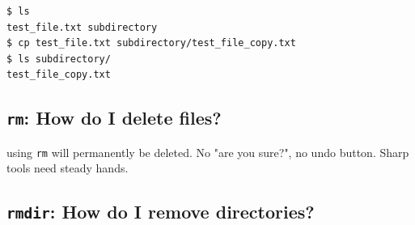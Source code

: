 \begin{lstlisting}
$ ls
test_file.txt subdirectory
$ cp test_file.txt subdirectory/test_file_copy.txt
$ ls subdirectory/
test_file_copy.txt
\end{lstlisting}


\subsection{\texttt{rm}: How do I delete files?}
\begin{tcolorbox}[colback=red!5!white, colframe=red!60!black,
                  title=\textbf{Notice}, fonttitle=\bfseries]
using \texttt{rm} will permanently be deleted. No "are you sure?", no undo button. Sharp tools need steady hands. 
\end{tcolorbox}


\subsection{\texttt{rmdir}: How do I remove directories?}

